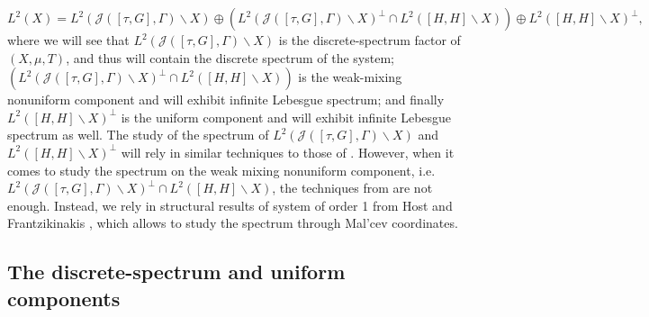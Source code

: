 \documentclass[letter, 11pt]{article}
\theoremstyle{definition}
\theoremstyle{plain}
\newcommand{\1}{\mathbbm{1}}
\begin{document}
$$L^2(X)= L^2( \mathcal{J}([\tau,G],\Gamma)\backslash X) \oplus \left( L^2( \mathcal{J}([\tau,G],\Gamma)\backslash X)^\perp \cap L^2([H,H]\backslash X)\right) \oplus L^2([H,H]\backslash X)^\perp,$$
where we will see that $L^2( \mathcal{J}([\tau,G],\Gamma)\backslash X)$ is the discrete-spectrum factor of $(X,\mu,T)$, and thus will contain the discrete spectrum of the system; $\left( L^2( \mathcal{J}([\tau,G],\Gamma)\backslash X)^\perp \cap L^2([H,H]\backslash X)\right) $ is the weak-mixing nonuniform component and will exhibit infinite Lebesgue spectrum; and finally $L^2([H,H]\backslash X)^\perp$ is the uniform component and will exhibit infinite Lebesgue spectrum as well. The study of the spectrum of $L^2( \mathcal{J}([\tau,G],\Gamma)\backslash X)$ and $L^2([H,H]\backslash X)^\perp$ will rely in similar techniques to those of \cite{MR4797105}. However, when it comes to study the spectrum on the weak mixing nonuniform component, i.e. $ L^2( \mathcal{J}([\tau,G],\Gamma)\backslash X)^\perp \cap L^2([H,H]\backslash X)$, the techniques from \cite{MR4797105} are not enough. Instead, we rely in structural results of system of order 1 from Host and Frantzikinakis \cite{FRANTZIKINAKIS_HOST_2018}, which allows to study the spectrum through Mal'cev coordinates. 

\subsection{The discrete-spectrum and uniform components}
\end{document}

